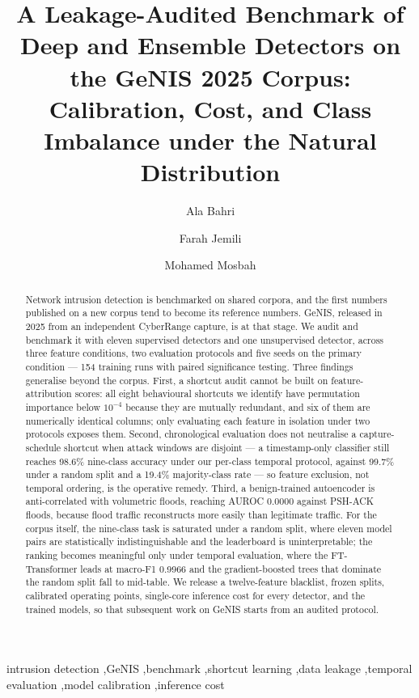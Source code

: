 \documentclass[review,12pt]{elsarticle}
\newcommand{\todo}[1]{\textcolor{red}{[TODO: #1]}}
\begin{document}
\begin{frontmatter}

\title{A Leakage-Audited Benchmark of Deep and Ensemble Detectors on the
GeNIS 2025 Corpus: Calibration, Cost, and Class Imbalance under the
Natural Distribution}

\author[1]{Ala Bahri}
\author[1]{Farah Jemili}
\author[2]{Mohamed Mosbah}
\affiliation[1]{organization={\todo{affiliation 1}}}
\affiliation[2]{organization={\todo{affiliation 2}}}

\begin{abstract}
Network intrusion detection is benchmarked on shared corpora, and the first numbers
published on a new corpus tend to become its reference numbers. GeNIS, released in 2025
from an independent CyberRange capture, is at that stage. We audit and benchmark it with
eleven supervised detectors and one unsupervised detector, across three feature
conditions, two evaluation protocols and five seeds on the primary condition --- 154
training runs with paired significance testing. Three findings generalise beyond the corpus. First, a shortcut audit cannot be
built on feature-attribution scores: all eight behavioural shortcuts we identify have
permutation importance below $10^{-4}$ because they are mutually redundant, and six of
them are numerically identical columns; only evaluating each feature in isolation under
two protocols exposes them. Second, chronological evaluation does not neutralise a
capture-schedule shortcut when attack windows are disjoint --- a timestamp-only
classifier still reaches 98.6\% nine-class accuracy under our per-class temporal
protocol, against 99.7\% under a random split and a 19.4\% majority-class rate --- so
feature exclusion, not temporal ordering, is the operative remedy. Third, a
benign-trained autoencoder is anti-correlated with volumetric floods, reaching AUROC
0.0000 against PSH-ACK floods, because flood traffic reconstructs more easily than
legitimate traffic. For the corpus itself, the nine-class task is saturated under a
random split, where eleven model pairs are statistically indistinguishable and the
leaderboard is uninterpretable; the ranking becomes meaningful only under temporal
evaluation, where the FT-Transformer leads at macro-F1 0.9966 and the gradient-boosted
trees that dominate the random split fall to mid-table. We release a twelve-feature
blacklist, frozen splits, calibrated operating points, single-core inference cost for
every detector, and the trained models, so that subsequent work on GeNIS starts from an
audited protocol.
\end{abstract}

\begin{keyword}
intrusion detection \sep GeNIS \sep benchmark \sep shortcut learning \sep data leakage
\sep temporal evaluation \sep model calibration \sep inference cost
\end{keyword}

\end{frontmatter}
\end{document}
